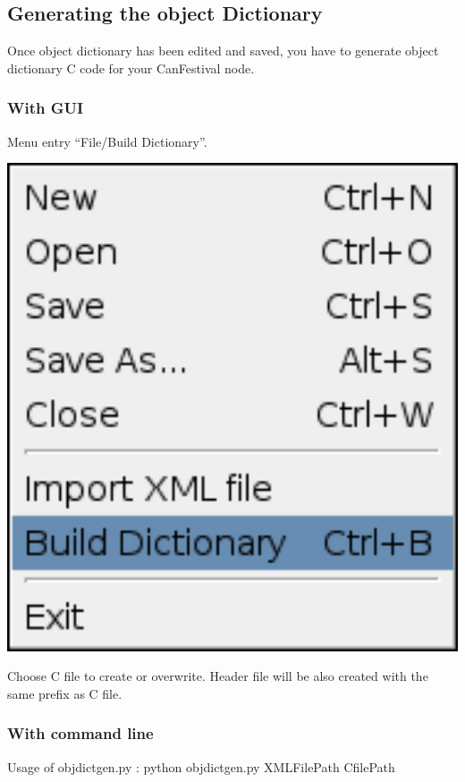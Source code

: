 \documentclass[12pt,twoside]{article}
\begin{document}
\subsection{Generating the object Dictionary}
Once object dictionary has been edited and saved, you have to generate
object dictionary C code for your CanFestival node.

\subsubsection{With GUI}
Menu entry ``File/Build Dictionary''.

 \begin{center}
   \includegraphics[width=15cm]{Pictures/10000201000000B7000000C66AF89CD5.png}
\end{center}

Choose C file to create or overwrite. Header file will be also created
with the same prefix as C file.

\subsubsection{With command line}
{\ttfamily
Usage of objdictgen.py :\newline
python objdictgen.py XMLFilePath CfilePath}
\end{document}
